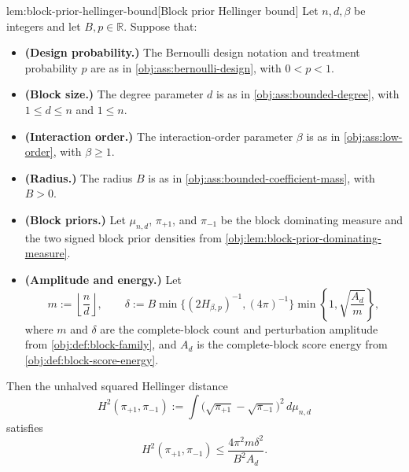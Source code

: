 \documentclass[11pt]{article}
\begin{document}
\begin{lemmav}{lem:block-prior-hellinger-bound}[Block prior Hellinger bound]
Let \(n,d,\beta\) be integers and let \(B,p\in\mathbb R\). Suppose that:
\begin{itemize}
\item \textbf{(Design probability.)} The Bernoulli design notation and treatment probability \(p\) are as in \cref{obj:ass:bernoulli-design}, with \(0<p<1\).
\item \textbf{(Block size.)} The degree parameter \(d\) is as in \cref{obj:ass:bounded-degree}, with \(1\le d\le n\) and \(1\le n\).
\item \textbf{(Interaction order.)} The interaction-order parameter \(\beta\) is as in \cref{obj:ass:low-order}, with \(\beta\ge1\).
\item \textbf{(Radius.)} The radius \(B\) is as in \cref{obj:ass:bounded-coefficient-mass}, with \(B>0\).
\item \textbf{(Block priors.)} Let \(\mu_{n,d}\), \(\pi_{+1}\), and \(\pi_{-1}\) be the block dominating measure and the two signed block prior densities from \cref{obj:lem:block-prior-dominating-measure}.
\item \textbf{(Amplitude and energy.)} Let
\[
m:=\left\lfloor\frac nd\right\rfloor,
\qquad
\delta
:=B\min\{(2H_{\beta,p})^{-1},(4\pi)^{-1}\}
  \min\left\{1,\sqrt{\frac{A_d}{m}}\right\},
\]
where \(m\) and \(\delta\) are the complete-block count and perturbation amplitude from \cref{obj:def:block-family}, and \(A_d\) is the complete-block score energy from \cref{obj:def:block-score-energy}.
\end{itemize}
Then the unhalved squared Hellinger distance
\[
H^2(\pi_{+1},\pi_{-1})
:=\int\bigl(\sqrt{\pi_{+1}}-\sqrt{\pi_{-1}}\bigr)^2\,d\mu_{n,d}
\]
satisfies
\[
H^2(\pi_{+1},\pi_{-1})
\le
\frac{4\pi^2m\delta^2}{B^2A_d}.
\]
\end{lemmav}
\end{document}
